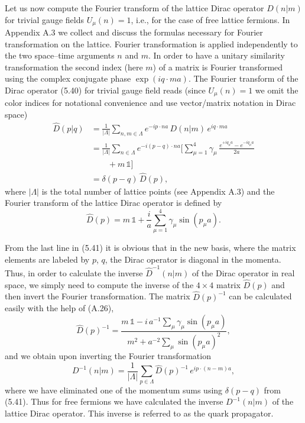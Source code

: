 Let us now compute the Fourier transform of the lattice Dirac operator
$D(n|m)$ for trivial gauge fields $U_\mu(n) = 1$, i.e., for the case of free lattice
fermions. In Appendix A.3 we collect and discuss the formulas necessary for
Fourier transformation on the lattice. Fourier transformation is applied independently to the two space--time arguments $n$ and $m$. In order to have
a unitary similarity transformation the second index (here $m$) of a matrix
is Fourier transformed using the complex conjugate phase $\exp(iq\cdot ma)$. The
Fourier transform of the Dirac operator (5.40) for trivial gauge field reads
(since $U_\mu(n) = 1$ we omit the color indices for notational convenience and use
vector/matrix notation in Dirac space)
\begin{equation}
  \begin{aligned}
    \hat{D}(p|q)
    &= \frac{1}{|\Lambda|}\sum_{n,m\in\Lambda}e^{-ip\cdot na}\,
      D(n|m)\,e^{iq\cdot ma}\\
    &= \frac{1}{|\Lambda|}\sum_{n\in\Lambda}e^{-i(p-q)\cdot na}\Big[
      \sum_{\mu=1}^{4}\gamma_\mu\,
      \frac{e^{+iq_\mu a} - e^{-iq_\mu a}}{2a}\\
    &\qquad + m\,\mathbb{1}\Big]\\
    &= \delta(p-q)\,\hat{D}(p) ,
  \end{aligned}
\end{equation}
where $|\Lambda|$ is the total number of lattice points (see Appendix A.3) and the
Fourier transform of the lattice Dirac operator is defined by
\begin{equation}
  \hat{D}(p) = m\,\mathbb{1} + \frac{i}{a}\sum_{\mu=1}^{4}\gamma_\mu\sin(p_\mu a) .
\end{equation}

From the last line in (5.41) it is obvious that in the new basis, where the matrix
elements are labeled by $p$, $q$, the Dirac operator is diagonal in the momenta.
Thus, in order to calculate the inverse $\hat{D}^{-1}(n|m)$ of the Dirac operator in real
space, we simply need to compute the inverse of the $4 \times 4$ matrix $\hat{D}(p)$ and
then invert the Fourier transformation. The matrix $\hat{D}(p)^{-1}$ can be calculated
easily with the help of (A.26),
\begin{equation}
  \hat{D}(p)^{-1} = \frac{m\,\mathbb{1} - i\,a^{-1}\sum_\mu\gamma_\mu\sin(p_\mu a)}
    {m^2 + a^{-2}\sum_\mu\sin(p_\mu a)^2} ,
\end{equation}
and we obtain upon inverting the Fourier transformation
\begin{equation}
  D^{-1}(n|m) = \frac{1}{|\Lambda|}\sum_{p\in\Lambda}\hat{D}(p)^{-1}\,
    e^{ip\cdot(n-m)a} ,
\end{equation}
where we have eliminated one of the momentum sums using $\delta(p-q)$ from
(5.41). Thus for free fermions we have calculated the inverse $D^{-1}(n|m)$ of the
lattice Dirac operator. This inverse is referred to as the quark propagator.

